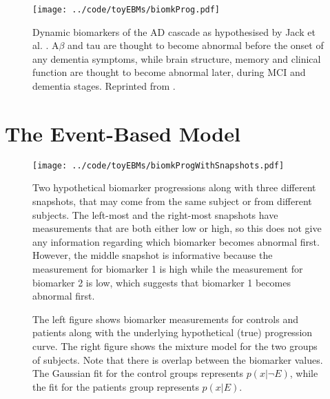 \begin{figure}
 \centering
 \texttt{[image: ../code/toyEBMs/biomkProg.pdf]}
 \caption[Biomarker cascade by Jack et al. \cite{jack2010hypothetical}]{Dynamic biomarkers of the AD cascade as hypothesised by Jack et al. \cite{jack2010hypothetical}. A$\beta$ and tau are thought to become abnormal before the onset of any dementia symptoms, while brain structure, memory and clinical function are thought to become abnormal later, during MCI and dementia stages. Reprinted from \cite{jack2010hypothetical}.}
 \label{fig:biomk_cascade}
\end{figure}


\section{The Event-Based Model}
\label{sec:ebm}

\begin{figure}
  \centering
  \texttt{[image: ../code/toyEBMs/biomkProgWithSnapshots.pdf]}
  \caption[Informative and uninformative snapshots in biomarker progression]{Two hypothetical biomarker progressions along with three different snapshots, that may come from the same subject or from different subjects. The left-most and the right-most snapshots have measurements that are both either low or high, so this does not give any information regarding which biomarker becomes abnormal first. However, the middle snapshot is informative because the measurement for biomarker 1 is high while the measurement for biomarker 2 is low, which suggests that biomarker 1 becomes abnormal first.}
\end{figure}

\begin{figure}
\centering
  \caption[Event-based model - biomarker data diagram]{The left figure shows biomarker measurements for controls and patients along with the underlying hypothetical (true) progression curve. The right figure shows the mixture model for the two groups of subjects. Note that there is overlap between the biomarker values. The Gaussian fit for the control groups represents $p(x|\neg E)$, while the fit for the patients group represents $p(x|E)$.}
\end{figure}

